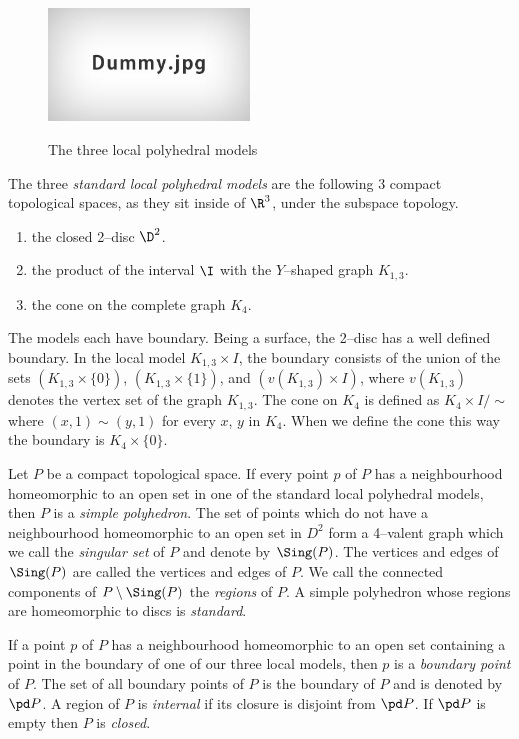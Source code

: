 \begin{defn}
	\begin{figure}
		\centering
		\caption{The three local polyhedral models}
		\includegraphics[height=3cm]{figures/dummy.jpg}
		\label{fig:localpoly}
	\end{figure}
	The three \emph{standard local polyhedral models} are the following 3 compact topological spaces, as they sit inside of $\R^3$, under the subspace topology.
	\begin{enumerate}
		\item the closed 2--disc $\D^2$.
		\item the product of the interval $\I$ with the $Y$--shaped graph $K_{1,3}$.
		\item the cone on the complete graph $K_4$.
	\end{enumerate}
	The models each have boundary.
	Being a surface, the 2--disc has a well defined boundary.
	In the local model $K_{1,3}\times I$, the boundary consists of the union of the sets $(K_{1,3}\times \{0\})$, $(K_{1,3}\times \{1\})$, and $(v(K_{1,3})\times I)$, where $v(K_{1,3})$ denotes the vertex set of the graph $K_{1,3}$.
	The cone on $K_4$ is defined as $K_4\times I /\sim$ where $(x,1)\sim (y,1)$ for every $x$, $y$ in $K_4$.
	When we define the cone this way the boundary is $K_4\times \{0\}$.
\end{defn}

\begin{defn}
	Let $P$ be a compact topological space.	
	If every point $p$ of $P$ has a neighbourhood homeomorphic to an open set in one of the standard local polyhedral models, then $P$ is a \emph{simple polyhedron}.
	The set of points which do not have a neighbourhood homeomorphic to an open set in $D^2$ form a 4--valent graph which we call the \emph{singular set} of $P$ and denote by $\Sing (P)$.
	The vertices and edges of $\Sing (P)$ are called the vertices and edges of $P$.
	We call the connected components of $P\setminus\Sing (P)$ the \emph{regions} of $P$.
	A simple polyhedron whose regions are homeomorphic to discs is \emph{standard}.
	
	If a point $p$ of $P$ has a neighbourhood homeomorphic to an open set containing a point in the boundary of one of our three local models, then $p$ is a \emph{boundary point} of $P$.
	The set of all boundary points of $P$ is the boundary of $P$ and is denoted by $\pd P$.
	A region of $P$ is \emph{internal} if its closure is disjoint from $\pd P$.
	If $\pd P$ is empty then $P$ is \emph{closed}.
\end{defn}

